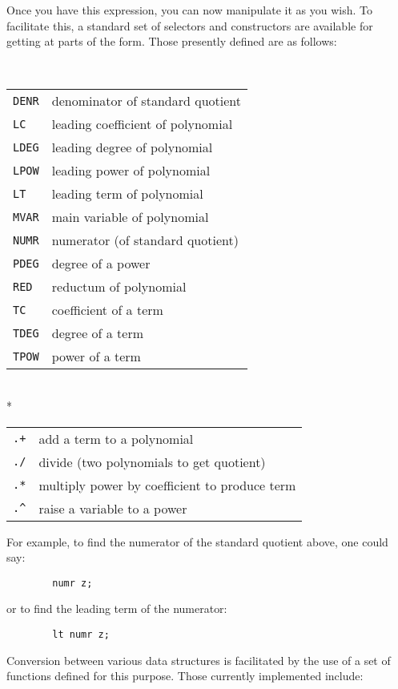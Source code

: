 Once you have this expression, you can now manipulate it as you wish.  To
facilitate this, a standard set of selectors and
constructors are available for getting at parts of the
form.  Those presently defined are as follows:
\begin{description}
\renewcommand{\arraystretch}{1.5}

\item[REDUCE Selectors]\mbox{}\\[-2mm]
%
\begin{tabular}{lp{\rboxwidth}}
\texttt{DENR} & denominator of standard quotient \\
%
\texttt{LC} & leading coefficient of polynomial \\
%
\texttt{LDEG} & leading degree of polynomial \\
%
\texttt{LPOW} & leading power of polynomial \\
%
\texttt{LT} & leading term of polynomial \\
%
\texttt{MVAR} & main variable of polynomial \\
%
\texttt{NUMR} & numerator (of standard quotient) \\
%
\texttt{PDEG} & degree of a power \\
%
\texttt{RED} & reductum of polynomial \\
%
\texttt{TC} & coefficient of a term \\
%
\texttt{TDEG} & degree of a term \\
%
\texttt{TPOW} & power of a term
\end{tabular}

\pagebreak
\item[REDUCE Constructors]\mbox{}\\*
%
\begin{tabular}{lp{\redboxwidth}}
\texttt{.+} & add a term to a polynomial \\
%
\texttt{./} & divide (two polynomials to get quotient) \\
\texttt{.*} & multiply power by coefficient to produce term \\
%
\texttt{.\textasciicircum} & raise a variable to a power
\end{tabular}
\end{description}

For example, to find the numerator of the standard quotient above, one
could say:
\begin{verbatim}
        numr z;
\end{verbatim}
or to find the leading term of the numerator:
\begin{verbatim}
        lt numr z;
\end{verbatim}
Conversion between various data structures is facilitated by the use of a
set of functions defined for this purpose. Those currently implemented
include:

